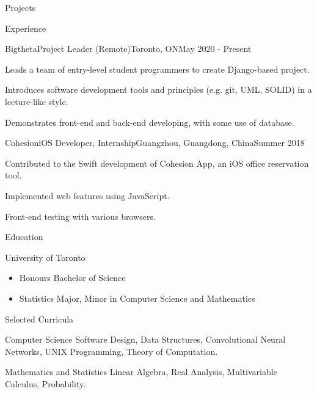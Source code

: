 \documentclass{article}
\newlength{\tabin}
\newlength{\secsep}
\newcommand{\lineunder}{\vspace*{-8pt} \\ \hspace*{-6pt} \hrulefill \\ \vspace*{-15pt}}
\newenvironment{tabbedsection}[1]{
  \begin{list}{}{
      \setlength{\itemsep}{0pt}
      \setlength{\labelsep}{0pt}
      \setlength{\labelwidth}{0pt}
      \setlength{\leftmargin}{\tabin}
      \setlength{\rightmargin}{\tabin}
      \setlength{\listparindent}{0pt}
      \setlength{\parsep}{0pt}
      \setlength{\parskip}{0pt}
      \setlength{\partopsep}{0pt}
      \setlength{\topsep}{#1}
    }
  \item[]
}{\end{list}}
\newenvironment{resume_section}[1]{
  \filbreak
  \vspace{2\secsep}
  \textsc{\large#1}
  \lineunder
  \begin{tabbedsection}{\secsep}
}{\end{tabbedsection}}
\newenvironment{resume_subsection}[2][]{
  \textbf{#2} \hfill {\footnotesize #1} \hspace{2em}
  \begin{tabbedsection}{0.5\secsep}
}{\end{tabbedsection}}
\newenvironment{subitems}{
  \renewcommand{\labelitemi}{-}
  \begin{itemize}
      \setlength{\labelsep}{1em}
}{\end{itemize}}
\newenvironment{resume_employer}[4]{
  \vspace{\secsep}
  \textbf{#1} \\ 
  \indent {\small #2} \hfill {\footnotesize#3 (#4)}
  \begin{tabbedsection}{0pt}
  \begin{subitems}
}{\end{subitems}\end{tabbedsection}}
\begin{document}
\begin{resume_section}{Projects}
\begin{resume_section}{Experience}
  
  \begin{resume_employer}{Bigtheta}{Project Leader (Remote)}{Toronto, ON}{May 2020 - Present}
    \item Leads a team of entry-level student programmers to create Django-based project.
    \item Introduces software development tools and principles (e.g. git, UML, SOLID) in a lecture-like style.  
    \item Demonstrates front-end and back-end developing, with some use of database. 
  \end{resume_employer}
  
  \begin{resume_employer}{Cohesion}{iOS Developer, Internship}{Guangzhou, Guangdong, China}{Summer 2018}
    \item Contributed to the Swift development of Cohesion App, an iOS office reservation tool. 
    \item Implemented web features using JavaScript.
    \item Front-end testing with various browsers.
  \end{resume_employer}
\end{resume_section}


\end{resume_section}
  
  \begin{resume_section}{Education}
    \begin{resume_subsection}{University of Toronto}
      \begin{subitems}
        \item Honours Bachelor of Science
        \item Statistics Major, Minor in Computer Science and Mathematics
      \end{subitems}
    \end{resume_subsection}
  \end{resume_section}

  \begin{resume_section}{Selected Curricula}
    \begin{resume_subsection}[]{Computer Science}
      Software Design, Data Structures, Convolutional Neural Networks, UNIX Programming, 
      Theory of Computation.
    \end{resume_subsection}
  \begin{resume_subsection}[]{Mathematics and Statistics}
    Linear Algebra, Real Analysis, Multivariable Calculus, Probability.
    \end{resume_subsection}
  \end{resume_section}
\end{document}
